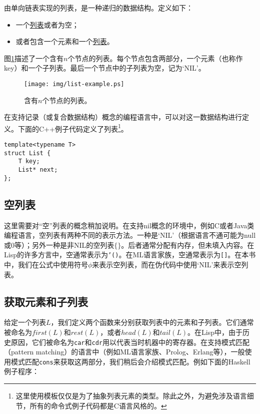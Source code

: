 \documentclass[UTF8]{article}
\begin{document}
由单向链表实现的列表，是一种递归的数据结构。定义如下：

\begin{itemize}
\item 一个\underline{列表}或者为空；
\item 或者包含一个元素和一个\underline{列表}。
\end{itemize}

图\ref{fig:list-example}描述了一个含有$n$个节点的列表。每个节点包含两部分，一个元素（也称作key）和一个子列表。最后一个节点中的子列表为空，记为‘NIL’。

\begin{figure}[htbp]
  \centering
  \texttt{[image: img/list-example.ps]}
  \caption{含有$n$个节点的列表。} \label{fig:list-example}
\end{figure}

在支持记录（或复合数据结构）概念的编程语言中，可以对这一数据结构进行定义。下面的C++例子代码定义了列表\footnote{这里使用模板仅仅是为了抽象列表元素的类型。除此之外，为避免涉及语言细节，所有的命令式例子代码都是C语言风格的。}。

\lstset{language=C++}
\begin{lstlisting}
template<typename T>
struct List {
    T key;
    List* next;
};
\end{lstlisting}

\subsection{空列表}

这里需要对“空”列表的概念稍加说明。在支持nil概念的环境中，例如C或者Java类编程语言，空列表有两种不同的表示方法。一种是‘NIL’（根据语言不通可能为null或0等）；另外一种是非NIL的空列表$\{ \}$。后者通常分配有内存，但未填入内容。在Lisp的许多方言中，空通常表示为\texttt{'()}。在ML语言家族，空通常表示为\texttt{[]}。在本书中，我们在公式中使用符号$\phi$来表示空列表，而在伪代码中使用‘NIL’来表示空列表。

\subsection{获取元素和子列表}

给定一个列表$L$，我们定义两个函数来分别获取列表中的元素和子列表。它们通常被命名为$first(L)$和$rest(L)$，或者$head(L)$和$tail(L)$。在Lisp中，由于历史原因，它们被命名为\texttt{car}和\texttt{cdr}用以代表当时机器中的寄存器\cite{SICP}。在支持模式匹配（pattern matching）的语言中（例如ML语言家族、Prolog、Erlang等），一般使用模式匹配\texttt{cons}来获取这两部分，我们稍后会介绍模式匹配。例如下面的Haskell例子程序：
\end{document}

